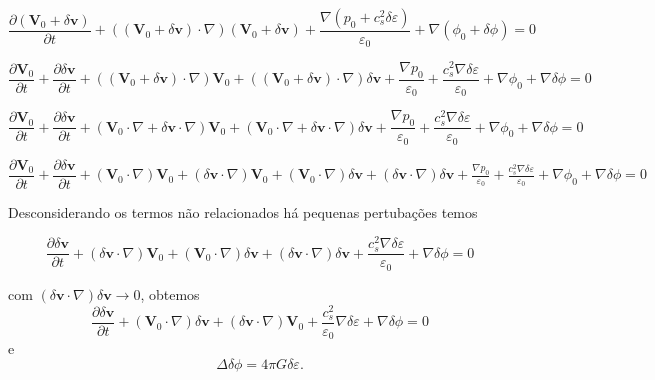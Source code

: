 \documentclass[a4paper,12pt]{article}
\begin{document}
$$\dfrac{\partial (\mathbf{V}_0 + \delta\mathbf{v}) }{\partial t} + ((\mathbf{V}_0 + \delta\mathbf{v}) \cdot \nabla ) (\mathbf{V}_0 + \delta\mathbf{v}) + \frac{\nabla (p_0 + c_s^2\delta\varepsilon)}{\varepsilon_0} + \nabla (\phi_0 + \delta\phi) =0$$

$$\dfrac{\partial \mathbf{V}_0 }{\partial t} +\dfrac{\partial \delta\mathbf{v} }{\partial t}+ ((\mathbf{V}_0 + \delta\mathbf{v}) \cdot \nabla )\mathbf{V}_0+ ((\mathbf{V}_0 + \delta\mathbf{v}) \cdot \nabla )\delta\mathbf{v} + \frac{\nabla p_0}{\varepsilon_0}+ \frac{c_s^2\nabla\delta\varepsilon}{\varepsilon_0} + \nabla \phi_0+ \nabla\delta\phi =0$$

$$\dfrac{\partial \mathbf{V}_0 }{\partial t} +\dfrac{\partial \delta\mathbf{v} }{\partial t}+ (\mathbf{V}_0\cdot \nabla + \delta\mathbf{v}\cdot \nabla)\mathbf{V}_0+ (\mathbf{V}_0\cdot \nabla + \delta\mathbf{v}\cdot \nabla) \delta\mathbf{v} + \frac{\nabla p_0}{\varepsilon_0}+ \frac{c_s^2\nabla\delta\varepsilon}{\varepsilon_0} + \nabla \phi_0+ \nabla\delta\phi =0$$

$\displaystyle\dfrac{\partial \mathbf{V}_0 }{\partial t} +\dfrac{\partial \delta\mathbf{v} }{\partial t}+ (\mathbf{V}_0\cdot \nabla)\mathbf{V}_0+ (\delta\mathbf{v}\cdot \nabla)\mathbf{V}_0+ (\mathbf{V}_0\cdot \nabla) \delta\mathbf{v} + (\delta\mathbf{v}\cdot \nabla) \delta\mathbf{v} + \frac{\nabla p_0}{\varepsilon_0}+ \frac{c_s^2\nabla\delta\varepsilon}{\varepsilon_0} + \nabla \phi_0+ \nabla\delta\phi =0$

Desconsiderando os termos não relacionados há pequenas pertubações temos

$$\dfrac{\partial \delta\mathbf{v} }{\partial t}+ (\delta\mathbf{v}\cdot \nabla)\mathbf{V}_0+ (\mathbf{V}_0\cdot \nabla) \delta\mathbf{v} + (\delta\mathbf{v}\cdot \nabla) \delta\mathbf{v} + \frac{c_s^2\nabla\delta\varepsilon}{\varepsilon_0}+ \nabla\delta\phi =0$$

com $(\delta\mathbf{v}\cdot \nabla) \delta\mathbf{v} \to 0$, obtemos
\begin{equation}
	\dfrac{\partial\delta\mathbf{v}}{\partial t} + (\mathbf{V}_0 \cdot \nabla)\delta\mathbf{v} + (\delta\mathbf{v} \cdot \nabla) \mathbf{V}_0 + \dfrac{c^2_s}{\varepsilon_0}\nabla\delta\varepsilon + \nabla\delta\phi = 0
\end{equation}
\newline
e
\begin{equation}
	\Delta\delta\phi = 4\pi G\delta\varepsilon.
\end{equation}
\end{document}

